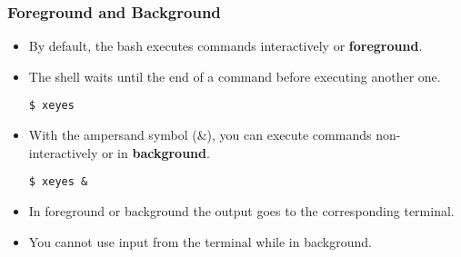 \begin{frame}[fragile]\frametitle{Foreground and Background}
\begin{itemize}
\item By default, the bash executes commands interactively or \textbf{foreground}.
\item The shell waits until the end of a command before executing another one.
\begin{lstlisting}
$ xeyes
\end{lstlisting}
\item With the ampersand symbol (\&), you can execute commands non-interactively or in \textbf{background}.
\begin{lstlisting}
$ xeyes &
\end{lstlisting}
\item In foreground or background the output goes to the corresponding terminal.
\item You cannot use input from the terminal while in background.
\end{itemize}
\end{frame}

